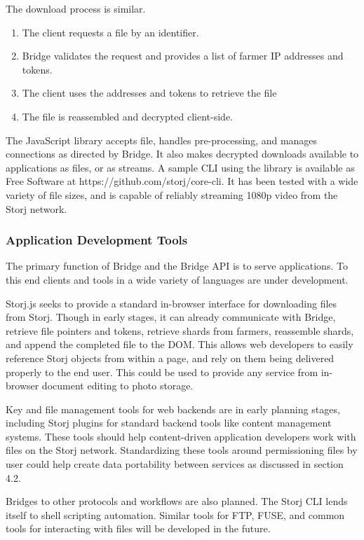 \documentclass[a4paper,10pt]{article}
\begin{document}
The download process is similar.

\begin{enumerate}
\item The client requests a file by an identifier.
\item Bridge validates the request and provides a list of farmer IP addresses and tokens.
\item The client uses the addresses and tokens to retrieve the file
\item The file is reassembled and decrypted client-side.
\end{enumerate}

The JavaScript library accepts file, handles pre-processing, and manages connections as directed by Bridge. It also makes decrypted downloads available to applications as files, or as streams. A sample CLI using the library is available as Free Software at https://github.com/storj/core-cli. It has been tested with a wide variety of file sizes, and is capable of reliably streaming 1080p video from the Storj network.

\subsubsection{Application Development Tools}
The primary function of Bridge and the Bridge API is to serve applications. To this end clients and tools in a wide variety of languages are under development.

Storj.js seeks to provide a standard in-browser interface for downloading files from Storj. Though in early stages, it can already communicate with Bridge, retrieve file pointers and tokens, retrieve shards from farmers, reassemble shards, and append the completed file to the DOM. This allows web developers to easily reference Storj objects from within a page, and rely on them being delivered properly to the end user. This could be used to provide any service from in-browser document editing to photo storage.

Key and file management tools for web backends are in early planning stages, including Storj plugins for standard backend tools like content management systems. These tools should help content-driven application developers work with files on the Storj network. Standardizing these tools around permissioning files by user could help create data portability between services as discussed in section 4.2.

Bridges to other protocols and workflows are also planned. The Storj CLI lends itself to shell scripting automation. Similar tools for FTP, FUSE, and common tools for interacting with files will be developed in the future.
\end{document}
